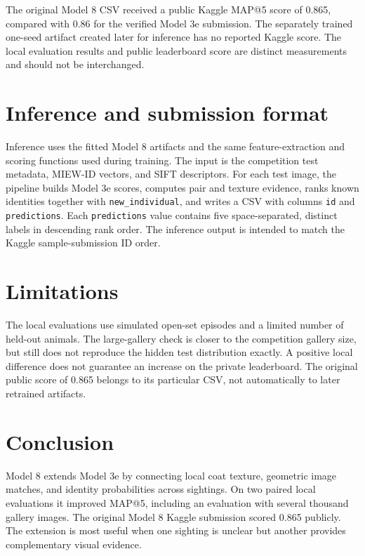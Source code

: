 \documentclass[11pt]{article}
\begin{document}
The original Model 8 CSV received a public Kaggle MAP@5 score of 0.865, compared with 0.86 for the verified Model 3e submission. The separately trained one-seed artifact created later for inference has no reported Kaggle score. The local evaluation results and public leaderboard score are distinct measurements and should not be interchanged.

\section{Inference and submission format}
Inference uses the fitted Model 8 artifacts and the same feature-extraction and scoring functions used during training. The input is the competition test metadata, MIEW-ID vectors, and SIFT descriptors. For each test image, the pipeline builds Model 3e scores, computes pair and texture evidence, ranks known identities together with \texttt{new\_individual}, and writes a CSV with columns \texttt{id} and \texttt{predictions}. Each \texttt{predictions} value contains five space-separated, distinct labels in descending rank order. The inference output is intended to match the Kaggle sample-submission ID order.

\section{Limitations}
The local evaluations use simulated open-set episodes and a limited number of held-out animals. The large-gallery check is closer to the competition gallery size, but still does not reproduce the hidden test distribution exactly. A positive local difference does not guarantee an increase on the private leaderboard. The original public score of 0.865 belongs to its particular CSV, not automatically to later retrained artifacts.

\section{Conclusion}
Model 8 extends Model 3e by connecting local coat texture, geometric image matches, and identity probabilities across sightings. On two paired local evaluations it improved MAP@5, including an evaluation with several thousand gallery images. The original Model 8 Kaggle submission scored 0.865 publicly. The extension is most useful when one sighting is unclear but another provides complementary visual evidence.
\end{document}
